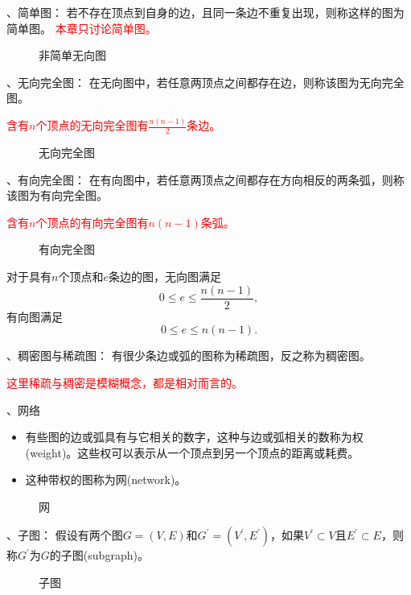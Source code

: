 \documentclass[10pt]{article}
\newcommand{\red}{\textcolor{red}}
\begin{document}
、简单图：
若不存在顶点到自身的边，且同一条边不重复出现，则称这样的图为简单图。
\red{本章只讨论简单图。}

\begin{figure}[htbp]
\centering

\caption{非简单无向图}
\end{figure}

、无向完全图：
在无向图中，若任意两顶点之间都存在边，则称该图为无向完全图。

\red{含有$n$个顶点的无向完全图有$\frac{n(n-1)}2$条边。}

\begin{figure}
\centering

\caption{无向完全图}
\end{figure}


、有向完全图：
在有向图中，若任意两顶点之间都存在方向相反的两条弧，则称该图为有向完全图。

\red{含有$n$个顶点的有向完全图有$n(n-1)$条弧。}

\begin{figure}
\centering

\caption{有向完全图}
\end{figure}

对于具有$n$个顶点和$e$条边的图，无向图满足
$$
0\le e \le \frac{n(n-1)}2,
$$
有向图满足
$$
0\le e \le n(n-1).
$$

、稠密图与稀疏图：
有很少条边或弧的图称为稀疏图，反之称为稠密图。

\red{这里稀疏与稠密是模糊概念，都是相对而言的。}

、网络
\begin{itemize}
\item
有些图的边或弧具有与它相关的数字，这种与边或弧相关的数称为权(weight)。这些权可以表示从一个顶点到另一个顶点的距离或耗费。
\item
这种带权的图称为网(network)。
\end{itemize}

\begin{figure}
\centering

\caption{网}
\end{figure}

、子图：
假设有两个图$G=(V,E)$和$G^\prime=(V^\prime,E^\prime)$，如果$V^\prime\subset V$且$E^\prime\subset E$，则称$G^\prime$为$G$的子图(subgraph)。

\begin{figure}
\centering

\caption{子图}
\end{figure}
\end{document}
